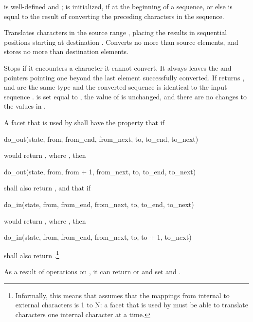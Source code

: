 \begin{itemdescr}
\pnum
\expects
{} is well-defined and ;
 is initialized, if at the beginning of a sequence,
or else is equal to the result of converting the preceding characters in the sequence.

\pnum
\effects
Translates characters in the source range
,
placing the results in sequential positions starting at destination .
Converts no more than
source elements, and
stores no more than
destination elements.

Stops if it encounters a character it cannot convert.
It always leaves the  and  pointers
pointing one beyond the last element successfully converted.
If returns
,
and
are the same type and the converted sequence is
identical to the input sequence
.
 is set equal to , the value of  is
unchanged, and there are no changes to the values in
.

\pnum
A
facet that is used by
 shall have the property that if
\begin{codeblock}
do_out(state, from, from_end, from_next, to, to_end, to_next)
\end{codeblock}
would return
,
where
,
then
\begin{codeblock}
do_out(state, from, from + 1, from_next, to, to_end, to_next)
\end{codeblock}
shall also return
,
and that if
\begin{codeblock}
do_in(state, from, from_end, from_next, to, to_end, to_next)
\end{codeblock}
would return
,
where
,
then
\begin{codeblock}
do_in(state, from, from_end, from_next, to, to + 1, to_next)
\end{codeblock}
shall also return
.\footnote{Informally, this means that
assumes that the mappings from internal to external characters is
1 to N: a
facet that is used by
must be able to translate characters one internal character at a time.
}
\begin{note}
As a result of operations on , it can return  or  and set  and .
\end{note}


\end{itemdescr}
